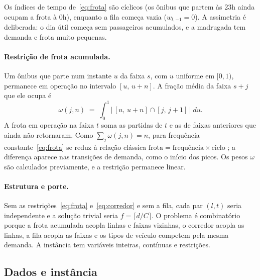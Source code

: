 \documentclass[11pt,a4paper]{article}
\newcommand{\tabela}[1]{\resizebox{\ifdim\width>\textwidth\textwidth\else\width\fi}{!}{}}
\begin{document}
Os índices de tempo de~\eqref{eq:frota} são cíclicos (os ônibus que partem às
23h ainda ocupam a frota à 0h), enquanto a fila começa vazia ($w_{l,-1}=0$).
A assimetria é deliberada: o dia útil começa sem passageiros acumulados, e a
madrugada tem demanda e frota muito pequenas.

\paragraph{Restrição de frota acumulada.}
Um ônibus que parte num instante $u$ da faixa $s$, com $u$ uniforme em $[0,1)$,
permanece em operação no intervalo $[u,\,u+n]$. A fração média da faixa $s+j$
que ele ocupa é
\begin{equation}
\omega(j,n) \;=\; \int_0^1 \bigl|\,[u,\,u+n]\cap[j,\,j+1]\,\bigr|\; du .
\end{equation}
A frota em operação na faixa $t$ soma as partidas de $t$ e as de faixas
anteriores que ainda não retornaram. Como $\sum_j \omega(j,n)=n$, para
frequência constante~\eqref{eq:frota} se reduz à relação clássica
$\text{frota}=\text{frequência}\times\text{ciclo}$ \citep{ceder2016}; a diferença
aparece nas transições de demanda, como o início dos picos. Os pesos $\omega$ são
calculados previamente, e a restrição permanece linear.

\paragraph{Estrutura e porte.}
Sem as restrições~\eqref{eq:frota} e~\eqref{eq:corredor} e sem a fila, cada par
$(l,t)$ seria independente e a solução trivial seria $f=\lceil d/C\rceil$. O
problema é combinatório porque a frota acumulada acopla linhas e faixas
vizinhas, o corredor acopla as linhas, a fila acopla as faixas e os tipos de
veículo competem pela mesma demanda. A instância tem \nVarInt{} variáveis
inteiras, \nVarCont{} contínuas e \nRestr{} restrições.

\begin{table}[htbp]
\centering
\caption{Parâmetros, valores e origem (GTFS e BHTRANS: dados oficiais; hipótese: valor adotado pelo grupo).}
\label{tab:fontes}
\small
\tabela{tabelas/parametros_fontes.tex}
\end{table}

\subsection{Dados e instância}\label{sec:dados}
\end{document}
